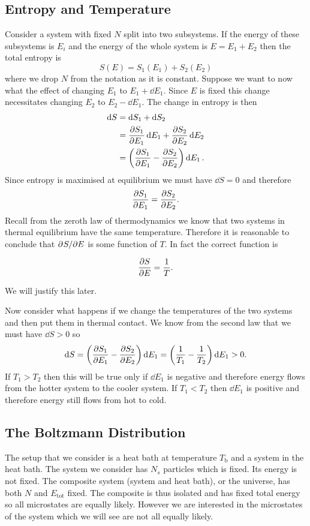 \documentclass[a4paper]{article}
\newcommand{\tot}{{\mathrm{tot}}}
\newcounter{keypointcounter}
\newenvironment{keypoint}{%
    \stepcounter{keypointcounter}
    \begin{tcolorbox}[breakable, title=Key Point \thekeypointcounter]
}{%
    \end{tcolorbox}
}
\begin{document}
    \subsection{Entropy and Temperature}
    Consider a system with fixed \(N\) split into two subsystems.
    If the energy of these subsystems is \(E_i\) and the energy of the whole system is \(E = E_1 + E_2\) then the total entropy is
    \[S(E) = S_1(E_1) + S_2(E_2)\]
    where we drop \(N\) from the notation as it is constant.
    Suppose we want to now what the effect of changing \(E_1\) to \(E_1 + \dd{E_1}\).
    Since \(E\) is fixed this change necessitates changing \(E_2\) to \(E_2 - \dd{E_1}\).
    The change in entropy is then
    \begin{align*}
        \dd{S} &= \dd{S_1} + \dd{S_2}\\
        &= \pdv{S_1}{E_1}\dd{E_1} + \pdv{S_2}{E_2}\dd{E_2}\\
        &= \left(\pdv{S_1}{E_1} - \pdv{S_2}{E_2}\right)\dd{E_1}.
    \end{align*}
    Since entropy is maximised at equilibrium we must have \(\dd{S} = 0\) and therefore
    \[\pdv{S_1}{E_1} = \pdv{S_2}{E_2}.\]
    Recall from the zeroth law of thermodynamics we know that two systems in thermal equilibrium have the same temperature.
    Therefore it is reasonable to conclude that \(\partial^{}{S}/\partial{E}^{}\) is some function of \(T\).
    In fact the correct function is
    \begin{keypoint}
        \[\pdv{S}{E} = \frac{1}{T}.\]
    \end{keypoint}
    We will justify this later.

    Now consider what happens if we change the temperatures of the two systems and then put them in thermal contact.
    We know from the second law that we must have \(\dd{S} > 0\) so
    \[\dd{S} = \left(\pdv{S_1}{E_1} - \pdv{S_2}{E_2}\right)\dd{E_1} = \left(\frac{1}{T_1} - \frac{1}{T_2}\right)\dd{E_1} > 0.\]
    If \(T_1 > T_2\) then this will be true only if \(\dd{E_1}\) is negative and therefore energy flows from the hotter system to the cooler system.
    If \(T_1 < T_2\) then \(\dd{E_1}\) is positive and therefore energy still flows from hot to cold.
    
    \subsection{The Boltzmann Distribution}\label{sec:the boltzmann distribution}
    The setup that we consider is a heat bath at temperature \(T_{\mathrm{b}}\) and a system in the heat bath.
    The system we consider has \(N_s\) particles which is fixed.
    Its energy is not fixed.
    The composite system (system and heat bath), or the universe, has both \(N\) and \(E_{\tot}\) fixed.
    The composite is thus isolated and has fixed total energy so all microstates are equally likely.
    However we are interested in the microstates of the system which we will see are not all equally likely.
    
\end{document}
